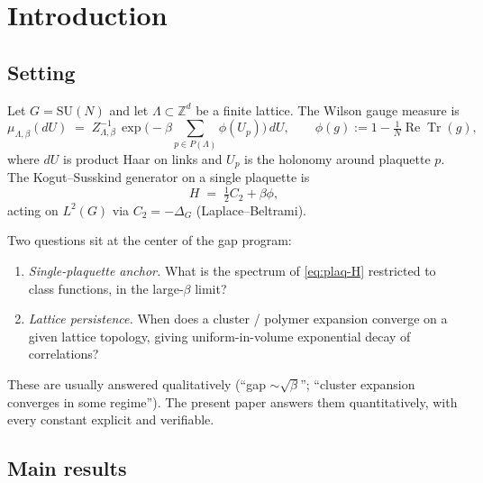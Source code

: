 \documentclass[11pt,a4paper]{article}
\theoremstyle{definition}
\newcommand{\SU}{\mathrm{SU}}
\newcommand{\Tr}{\operatorname{Tr}}
\renewcommand{\Re}{\operatorname{Re}}
\newcommand{\Z}{\mathbb{Z}}
\newcommand{\Cas}{C_2}
\begin{document}
\section{Introduction}

\subsection{Setting}

Let $G = \SU(N)$ and let $\Lambda\subset\Z^d$ be a finite lattice. The
Wilson gauge measure is
\begin{equation}\label{eq:wilson-measure}
\mu_{\Lambda,\beta}(dU)
\;=\;
Z_{\Lambda,\beta}^{-1}\,
\exp\Big(-\beta\sum_{p\in P(\Lambda)} \phi(U_p)\Big)\,dU,
\qquad
\phi(g) := 1 - \tfrac{1}{N}\Re\Tr(g),
\end{equation}
where $dU$ is product Haar on links and $U_p$ is the holonomy around
plaquette $p$. The Kogut--Susskind generator on a single plaquette is
\begin{equation}\label{eq:plaq-H}
H \;=\; \tfrac{1}{2}\Cas + \beta\phi,
\end{equation}
acting on $L^2(G)$ via $\Cas = -\Delta_G$ (Laplace--Beltrami).

Two questions sit at the center of the gap program:
\begin{enumerate}[label=(Q\arabic*)]
\item\emph{Single-plaquette anchor.} What is the spectrum of
\eqref{eq:plaq-H} restricted to class functions, in the large-$\beta$
limit?
\item\emph{Lattice persistence.} When does a cluster / polymer
expansion converge on a given lattice topology, giving uniform-in-volume
exponential decay of correlations?
\end{enumerate}

These are usually answered qualitatively (``gap $\sim\sqrt\beta$'';
``cluster expansion converges in some regime''). The present paper
answers them quantitatively, with every constant explicit and
verifiable.

\subsection{Main results}
\end{document}
